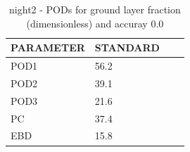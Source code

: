 \begin{table}[p!]
\begin{center}
\begin{tabular}{|l|l|l|l|}
\hline
\multicolumn{1}{|c|}{\cellcolor[HTML]{C0C0C0}\textbf{PARAMETER}} & \multicolumn{1}{c|}{\cellcolor[HTML]{C0C0C0}\textbf{STANDARD}} \\
\hline
\cellcolor[HTML]{C0C0C0}POD1  & 56.2                                \\
\cellcolor[HTML]{C0C0C0}POD2  & 39.1                                \\
\cellcolor[HTML]{C0C0C0}POD3  & 21.6                                \\
\cellcolor[HTML]{C0C0C0}PC    & 37.4                                  \\
\cellcolor[HTML]{C0C0C0}EBD   & 15.8                                 \\
\hline
\end{tabular}
\caption{night2 - PODs for ground layer fraction (dimensionless) and accuray 0.0}
\label{tab:podglf0.0:night2}
\end{center}
\end{table}
